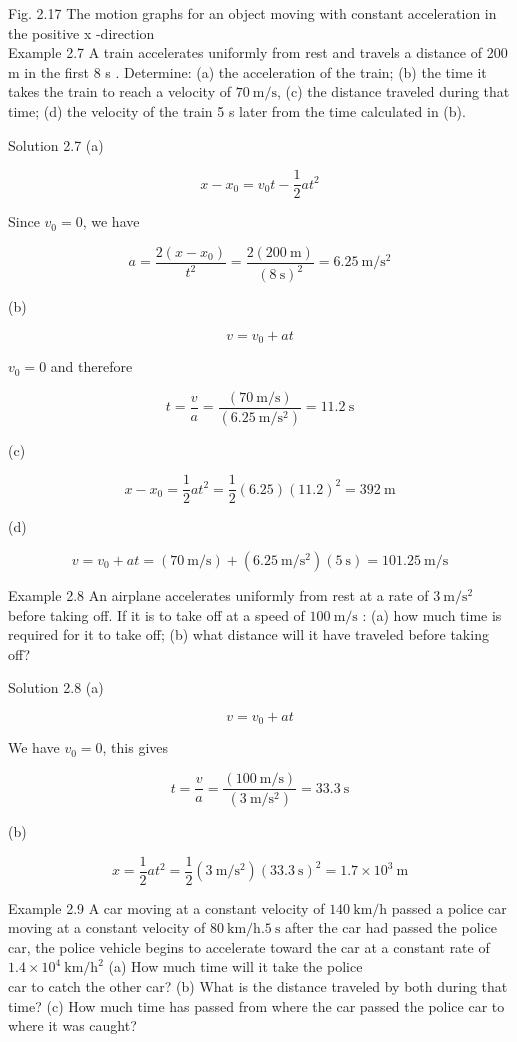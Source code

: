 \documentclass[10pt]{article}
\begin{document}
Fig. 2.17 The motion graphs for an object moving with constant acceleration in the positive x -direction\\
Example 2.7 A train accelerates uniformly from rest and travels a distance of 200 m in the first 8 s . Determine: (a) the acceleration of the train; (b) the time it takes the train to reach a velocity of $70 \mathrm{~m} / \mathrm{s}$, (c) the distance traveled during that time; (d) the velocity of the train 5 s later from the time calculated in (b).

Solution 2.7 (a)

$$
x-x_{0}=v_{0} t-\frac{1}{2} a t^{2}
$$

Since $v_{0}=0$, we have

$$
a=\frac{2\left(x-x_{0}\right)}{t^{2}}=\frac{2(200 \mathrm{~m})}{(8 \mathrm{~s})^{2}}=6.25 \mathrm{~m} / \mathrm{s}^{2}
$$

(b)

$$
v=v_{0}+a t
$$

$v_{0}=0$ and therefore

$$
t=\frac{v}{a}=\frac{(70 \mathrm{~m} / \mathrm{s})}{\left(6.25 \mathrm{~m} / \mathrm{s}^{2}\right)}=11.2 \mathrm{~s}
$$

(c)

$$
x-x_{0}=\frac{1}{2} a t^{2}=\frac{1}{2}(6.25)(11.2)^{2}=392 \mathrm{~m}
$$

(d)

$$
v=v_{0}+a t=(70 \mathrm{~m} / \mathrm{s})+\left(6.25 \mathrm{~m} / \mathrm{s}^{2}\right)(5 \mathrm{~s})=101.25 \mathrm{~m} / \mathrm{s}
$$

Example 2.8 An airplane accelerates uniformly from rest at a rate of $3 \mathrm{~m} / \mathrm{s}^{2}$ before taking off. If it is to take off at a speed of $100 \mathrm{~m} / \mathrm{s}$ : (a) how much time is required for it to take off; (b) what distance will it have traveled before taking off?

Solution 2.8 (a)

$$
v=v_{0}+a t
$$

We have $v_{0}=0$, this gives

$$
t=\frac{v}{a}=\frac{(100 \mathrm{~m} / \mathrm{s})}{\left(3 \mathrm{~m} / \mathrm{s}^{2}\right)}=33.3 \mathrm{~s}
$$

(b)

$$
x=\frac{1}{2} a t^{2}=\frac{1}{2}\left(3 \mathrm{~m} / \mathrm{s}^{2}\right)(33.3 \mathrm{~s})^{2}=1.7 \times 10^{3} \mathrm{~m}
$$

Example 2.9 A car moving at a constant velocity of $140 \mathrm{~km} / \mathrm{h}$ passed a police car moving at a constant velocity of $80 \mathrm{~km} / \mathrm{h} .5 \mathrm{~s}$ after the car had passed the police car, the police vehicle begins to accelerate toward the car at a constant rate of $1.4 \times 10^{4} \mathrm{~km} / \mathrm{h}^{2}$ (a) How much time will it take the police\\
car to catch the other car? (b) What is the distance traveled by both during that time? (c) How much time has passed from where the car passed the police car to where it was caught?
\end{document}
